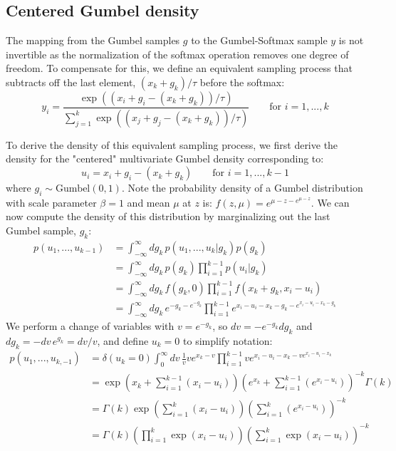 \documentclass{article} %
\begin{document}
\subsection{Centered Gumbel density}
The mapping from the Gumbel samples $g$ to the Gumbel-Softmax sample $y$ is not invertible as the normalization of the softmax operation removes one degree of freedom. To compensate for this, we define an equivalent sampling process that subtracts off the last element, $(x_k + g_k) / \tau$ before the softmax:
\begin{equation}
y_i = \frac{\exp\left((x_i + g_i - (x_k + g_k)) / \tau\right)  }{\sum_{j=1}^k \exp\left((x_j + g_j - (x_k + g_k))/\tau \right)}\qquad \text{for } i =1,..., k
\end{equation}

To derive the density of this equivalent sampling process, we first derive the density for the "centered" multivariate Gumbel density corresponding to:
\begin{equation}
u_i = x_i + g_i - (x_k + g_k) \qquad \text{for } i = 1, ..., k-1
\end{equation}
where $g_i \sim \text{Gumbel}(0, 1)$. Note the probability density of a Gumbel distribution with scale parameter $\beta=1$ and mean $\mu$ at $z$ is: $f(z, \mu) = e^{\mu-z-e^{\mu-z}}$. We can now compute the density of this distribution by marginalizing out the last Gumbel sample, $g_k$:
\begin{align*}
p(u_1, ..., u_{k-1}) &= \int_{-\infty}^\infty d g_k\, p(u_1, ..., u_{k} | g_k) p(g_k)\\
&=\int_{-\infty}^\infty d g_k\, p(g_k) \prod_{i=1}^{k-1} p(u_i | g_k)\\
&= \int_{-\infty}^\infty d g_k\, f(g_k, 0) \prod_{i=1}^{k-1} f(x_k + g_k, x_i - u_i )\\
&= \int_{-\infty}^\infty d g_k\, e^{ - g_k - e^{ - g_k}} \prod_{i=1}^{k-1} e^{x_i - u_i - x_k-g_k - e^{x_i - u_i - x_k-g_k}}
\end{align*}
We perform a change of variables with $v=e^{-g_k}$, so $dv=-e^{-g_k}dg_k$ and $dg_k = -dv\, e^{g_k}=dv/v$, and define $u_k=0$ to simplify notation:
\begin{align}\label{eq:gumbel_centered}
p(u_1, ..., u_{k, -1})&= \delta(u_k=0)\int_{0}^\infty d v\, \frac{1}{v} ve^{x_k - v} \prod_{i=1}^{k-1} ve^{x_i - u_i-x_k  - ve^{x_i - u_i-x_k}}\\
&= \exp\left(x_k+\sum_{i=1}^{k-1}(x_i - u_i)\right)\left(e^{x_k} + \sum_{i=1}^{k-1} \left(e^{x_i - u_i}\right)\right)^{-k} \Gamma(k)\\
&= \Gamma(k)\exp\left(\sum_{i=1}^{k}(x_i - u_i)\right)\left(\sum_{i=1}^{k} \left(e^{x_i - u_i}\right)\right)^{-k}\\
&= \Gamma(k)\left(\prod_{i=1}^k\exp\left(x_i - u_i\right)\right)\left(\sum_{i=1}^{k} \exp\left(x_i - u_i\right)\right)^{-k}
\end{align}
\end{document}

